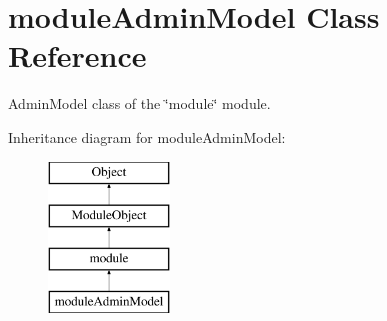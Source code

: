 \hypertarget{classmoduleAdminModel}{\section{module\+Admin\+Model Class Reference}
\label{classmoduleAdminModel}
}


Admin\+Model class of the \char`\"{}module\char`\"{} module.  


Inheritance diagram for module\+Admin\+Model\+:\begin{figure}[H]
\begin{center}
\leavevmode
\includegraphics[height=4.000000cm]{classmoduleAdminModel}
\end{center}
\end{figure}
